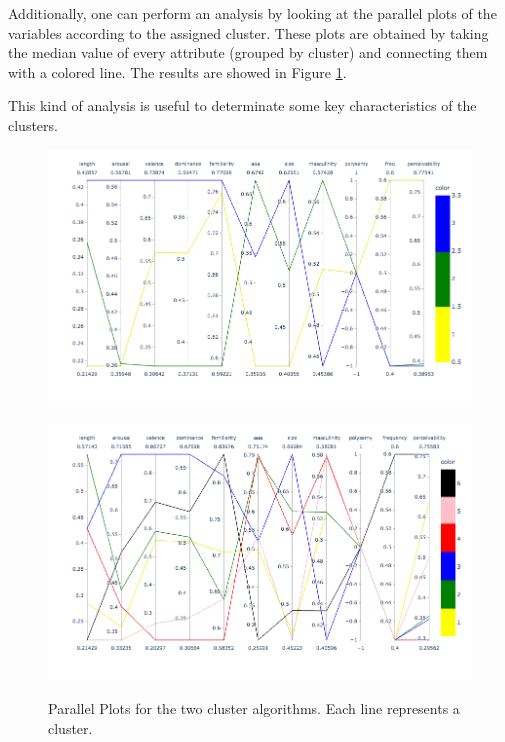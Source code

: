 \documentclass[a4paper,11pt,dvipsnames]{article}
\begin{document}
Additionally, one can perform an analysis by looking at the parallel plots of the variables according to the assigned cluster. These plots are obtained by taking the median value of every attribute (grouped by cluster) and connecting them with a colored line. The results are showed in Figure \ref{fig:boxcluster}.

This kind of analysis is useful to determinate some key characteristics of the clusters. 

\begin{figure}[h]
\centering
    \begin{minipage}{0.49\linewidth}
            \centering
            \includegraphics[width=\textwidth]{parallel_KM.png}
            \label{fig:boxclukmeans}
    \end{minipage}
    \hfil
    \begin{minipage}{0.49\linewidth}
            \centering
            \includegraphics[width=\textwidth]{parallel_HC.png}
            \label{fig:boxcluhier}
    \end{minipage}
        \caption{Parallel Plots for the two cluster algorithms. Each line represents a cluster.}
    \label{fig:boxcluster}
    
    \end{figure}
\end{document}
